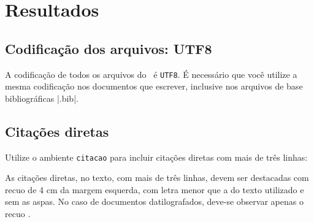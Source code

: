 

\chapter{Resultados}\label{cap_exemplos}


\section{Codifica\c{c}\~{a}o dos arquivos: UTF8}

A codifica\c{c}\~{a}o de todos os arquivos do \abnTeX\ \'{e} \texttt{UTF8}. \'{E} necess\'{a}rio que
voc\^{e} utilize a mesma codifica\c{c}\~{a}o nos documentos que escrever, inclusive nos
arquivos de base bibliogr\'{a}ficas |.bib|.

\section{Cita\c{c}\~{o}es diretas}
\label{sec-citacao}

Utilize o ambiente \texttt{citacao} para incluir
cita\c{c}\~{o}es diretas com mais de tr\^{e}s linhas:

\begin{citacao}
As cita\c{c}\~{o}es diretas, no texto, com mais de tr\^{e}s linhas, devem ser
destacadas com recuo de 4 cm da margem esquerda, com letra menor que a do texto
utilizado e sem as aspas. No caso de documentos datilografados, deve-se
observar apenas o recuo \cite[5.3]{NBR10520:2002}.
\end{citacao}

